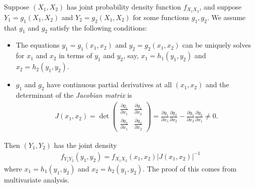 \documentclass[15pt,a4paper]{book}
\theoremstyle{definition}
\newcommand{\eax}[1]{\emph{#1}\index{#1}} %
\newcommand{\abs}[1]{\left| #1 \right|} %
\begin{document}
Suppose $(X_{1},X_{2})$ has joint probability density function $f_{X_{1}X_{2}}$, and suppose $Y_{1} = g_{1}(X_{1},X_{2})$ and $Y_{2} = g_{2}(X_{1},X_{2})$ for some functions $g_{1},g_{2}$. We assume that $g_{1}$ and $g_{2}$ satisfy the following conditions:
\begin{itemize}
    \item The equations $y_{1} = g_{1}(x_{1},x_{2})$ and $y_{2} = g_{2}(x_{1},x_{2})$ can be uniquely solves for $x_{1}$ and $x_{2}$ in terms of $y_{1}$ and $y_{2}$, say, $x_{1} = h_{1}(y_{1},y_{2})$ and $x_{2} = h_{2}(y_{1},y_{2})$.
    \item $g_{1}$ and $g_{2}$ have continuous partial derivatives at all $(x_{1},x_{2})$ and the determinant of the \eax{Jacobian matrix} is
    \begin{align}
        J(x_{1},x_{2}) = \det \begin{pmatrix}
            \frac{\partial g_{1}}{\partial x_{1}} & \frac{\partial g_{1}}{\partial x_{2}} \\ \frac{\partial g_{2}}{\partial x_{1}} & \frac{\partial g_{2}}{\partial x_{2}} 
        \end{pmatrix}
        = \frac{\partial g_{1}}{\partial x_{1}} \frac{\partial g_{2}}{\partial x_{2}} - \frac{\partial g_{1}}{\partial x_{2}}\frac{\partial g_{2}}{\partial x_{1}} \neq 0.
    \end{align}
\end{itemize}
Then $(Y_{1},Y_{2})$ has the joint density
\begin{align}
    f_{Y_{1}Y_{2}}(y_{1},y_{2}) = f_{X_{1}X_{2}}(x_{1},x_{2}) \abs{J(x_{1},x_{2})}^{-1}
\end{align}
where $x_{1} = h_{1}(y_{1},y_{2})$ and $x_{2} = h_{2}(y_{1},y_{2})$. The proof of this comes from multivariate analysis.
\end{document}
